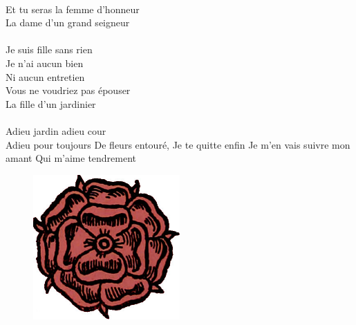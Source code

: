 \\Et tu seras la femme d'honneur 
\\La dame d'un grand seigneur
\\\\Je suis fille sans rien
\\Je n'ai aucun bien
\\Ni aucun entretien
\\Vous ne voudriez pas épouser
\\La fille d'un jardinier
\\\\Adieu jardin adieu cour
\\Adieu pour toujours
{De fleurs entouré,}
{Je te quitte enfin}
{Je m'en vais suivre mon amant}
{Qui m'aime tendrement}

\bigskip
\begin{figure}[h!]
\centering
   \includegraphics[width=0.5\textwidth]{images/brev47.png}
 \end{figure}
 

\breakpage